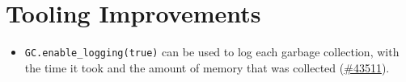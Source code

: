 \hypertarget{17774285514509357554}{}


\chapter{Tooling Improvements}



\begin{itemize}
\item \texttt{GC.enable\_logging(true)} can be used to log each garbage collection, with the time it took and the amount of memory that was collected (\href{https://github.com/JuliaLang/julia/issues/43511}{\#43511}).

\end{itemize}
